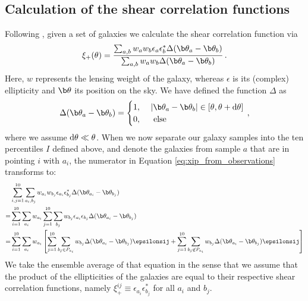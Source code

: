 \subsection{Calculation of the shear correlation functions}
\label{sec:calc of xipm}
Following \citet{2017MNRAS.465.1454H}, given a set of galaxies we calculate the shear correlation function via \begin{equation}
\xi_+(\theta) = \frac{\sum_{a,b}w_aw_b\epsilon_a\epsilon_b^*\Delta(\b\theta_a-\b\theta_b)}{\sum_{a,b}w_aw_b\Delta(\b\theta_a-\b\theta_b)}\, .
\label{eq:xip_from_observations}
\end{equation}
Here, $w$ represents the lensing weight of the galaxy, whereas $\epsilon$ is its (complex) ellipticity and $\b \theta$ its position on the sky. We have defined the function $\Delta$ as \[
\Delta(\b\theta_a-\b\theta_b) = \begin{cases}
1, \,\, & |\b\theta_a-\b\theta_b| \in [\theta,\theta+{\rm d}\theta] \\
0, & \text{ else}
\end{cases}\, ,
\]
where we assume ${\rm d}\theta \ll \theta$. When we now separate our galaxy samples into the ten percentiles $I$ defined above, and denote the galaxies from sample $a$ that are in pointing $i$ with $a_i$, the numerator in Equation \eqref{eq:xip_from_observations} transforms to:
\begin{align*}
 & \sum_{i,j=1}^{10} \sum_{a_i,b_j} w_{a_i}w_{b_j}\epsilon_{a_i}\epsilon_{b_j}^*\Delta(\b\theta_{a_i}-\b\theta_{b_j}) \\
 = & \sum_{i=1}^{10}\sum_{a_i}w_{a_i} \sum_{j=1}^{10} \sum_{b_j} w_{b_j}\epsilon_{a_i}\epsilon_{b_j}\Delta(\b\theta_{a_i}-\b\theta_{b_j}) \\
 = & \sum_{i=1}^{10}\sum_{a_i}w_{a_i} \left[ \sum_{j=1}^{10} \sum_{b_j\in P_{a_i}} w_{b_j} \Delta(\b\theta_{a_i}-\b\theta_{b_j})\epsilonsij + \sum_{j=1}^{10}\sum_{b_j\not\in P_{a_i}} w_{b_j} \Delta(\b\theta_{a_i}-\b\theta_{b_j})\epsilonsij \right]
\end{align*}
We take the ensemble average of that equation in the sense that we assume that the product of the ellipticities of the galaxies are equal to their respective shear correlation functions, namely $\xi_+^{ij}\equiv \epsilon_{a_i}\epsilon_{b_j}^*$ for all $a_i$ and $b_j$.


